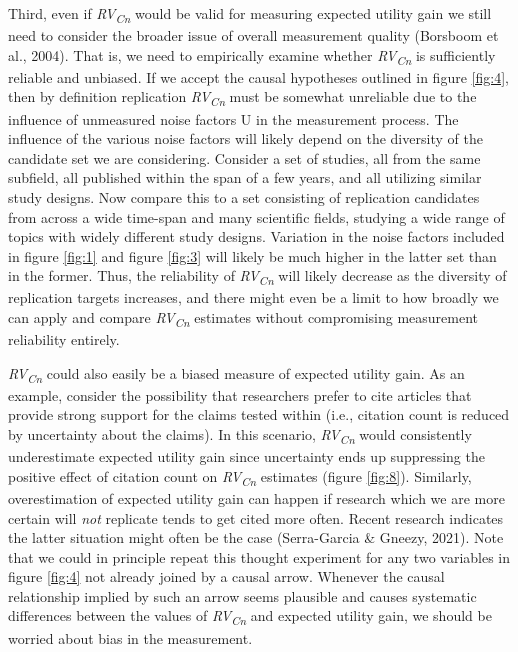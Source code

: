 \documentclass[
  english,
  jou,floatsintext]{apa6}
\begin{document}
Third, even if \emph{RV\textsubscript{Cn}} would be valid for measuring expected utility gain we still need to consider the broader issue of overall measurement quality (Borsboom et al., 2004). That is, we need to empirically examine whether \emph{RV\textsubscript{Cn}} is sufficiently reliable and unbiased. If we accept the causal hypotheses outlined in figure \ref{fig:4}, then by definition replication \emph{RV\textsubscript{Cn}} must be somewhat unreliable due to the influence of unmeasured noise factors U in the measurement process. The influence of the various noise factors will likely depend on the diversity of the candidate set we are considering. Consider a set of studies, all from the same subfield, all published within the span of a few years, and all utilizing similar study designs. Now compare this to a set consisting of replication candidates from across a wide time-span and many scientific fields, studying a wide range of topics with widely different study designs. Variation in the noise factors included in figure \ref{fig:1} and figure \ref{fig:3} will likely be much higher in the latter set than in the former. Thus, the reliability of \emph{RV\textsubscript{Cn}} will likely decrease as the diversity of replication targets increases, and there might even be a limit to how broadly we can apply and compare \emph{RV\textsubscript{Cn}} estimates without compromising measurement reliability entirely.

\emph{RV\textsubscript{Cn}} could also easily be a biased measure of expected utility gain. As an example, consider the possibility that researchers prefer to cite articles that provide strong support for the claims tested within (i.e., citation count is reduced by uncertainty about the claims). In this scenario, \emph{RV\textsubscript{Cn}} would consistently underestimate expected utility gain since uncertainty ends up suppressing the positive effect of citation count on \emph{RV\textsubscript{Cn}} estimates (figure \ref{fig:8}). Similarly, overestimation of expected utility gain can happen if research which we are more certain will \emph{not} replicate tends to get cited more often. Recent research indicates the latter situation might often be the case (Serra-Garcia \& Gneezy, 2021). Note that we could in principle repeat this thought experiment for any two variables in figure \ref{fig:4} not already joined by a causal arrow. Whenever the causal relationship implied by such an arrow seems plausible and causes systematic differences between the values of \emph{RV\textsubscript{Cn}} and expected utility gain, we should be worried about bias in the measurement.
\end{document}
